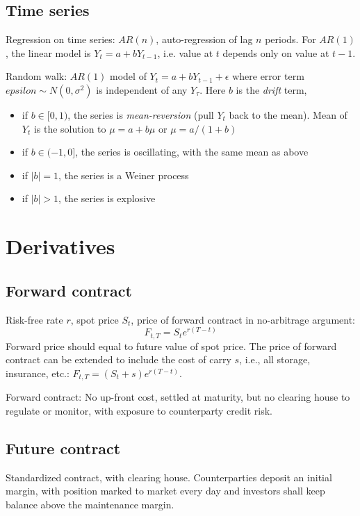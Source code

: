 \documentclass[9pt,twocolumn]{extarticle}
\begin{document}
\subsection*{Time series}

Regression on time series: $AR(n)$, auto-regression of lag $n$ periods. For
$AR(1)$, the linear model is $Y_t = a + bY_{t-1}$, i.e. value at $t$ depends
only on value at $t-1$.

Random walk: $AR(1)$ model of $Y_t = a + b Y_{t-1} + \epsilon$ where error term
$epsilon \sim N(0,\sigma^2)$ is independent of any $Y_{\tau}$. Here $b$ is the
\emph{drift} term,
\begin{itemize}
\item if $b\in[0,1)$, the series is \emph{mean-reversion} (pull $Y_t$ back to
the mean). Mean of $Y_t$ is the solution to $\mu = a + b \mu$ or $\mu = a/(1+b)$
\item if $b\in(-1,0]$, the series is oscillating, with the same mean as above
\item if $|b|=1$, the series is a Weiner process
\item if $|b|>1$, the series is explosive
\end{itemize}

\section{Derivatives}

\subsection*{Forward contract}

Risk-free rate $r$, spot price $S_t$, price of forward contract in no-arbitrage
argument:
$$ F_{t,T} = S_t e^{r(T-t)} $$
Forward price should equal to future value of spot price. The price of forward
contract can be extended to include the cost of carry $s$, i.e., all storage,
insurance, etc.: $F_{t,T} = (S_t + s)e^{r(T-t)}$.

Forward contract: No up-front cost, settled at maturity, but no clearing house
to regulate or monitor, with exposure to counterparty credit risk.

\subsection*{Future contract}

Standardized contract, with clearing house. Counterparties deposit an initial
margin, with position marked to market every day and investors shall keep
balance above the maintenance margin.
\end{document}

